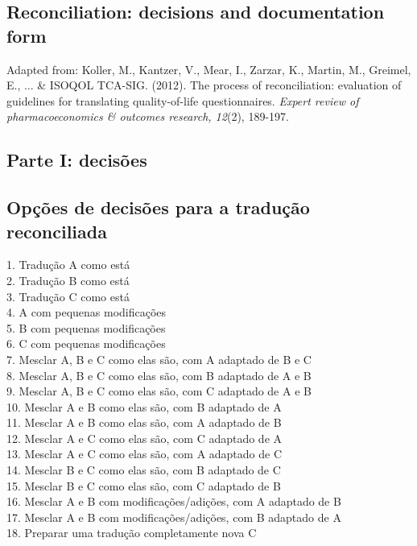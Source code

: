 \begin{appendix}
\section{Reconciliation: decisions and documentation form}
\label{appendix:form}
Adapted from: Koller, M., Kantzer, V., Mear, I., Zarzar, K., Martin, M., Greimel, E., ... \& ISOQOL TCA-SIG. (2012). The process of reconciliation: evaluation of guidelines for translating quality-of-life questionnaires. \textit{Expert review of pharmacoeconomics \& outcomes research, 12}(2), 189-197.
\begin{flushleft}
\subsection{Parte I: decisões}

\subsection{Opções de decisões para a tradução reconciliada}
1.	Tradução A como está\\
2.	Tradução B como está\\
3.	Tradução C como está\\
4.	A com pequenas modificações\\
5.	B com pequenas modificações\\
6.	C com pequenas modificações\\
7.	Mesclar A, B e C como elas são, com A adaptado de B e C\\
8.	Mesclar A, B e C como elas são, com B adaptado de A e B\\
9.	Mesclar A, B e C como elas são, com C adaptado de A e B\\
10.	Mesclar A e B como elas são, com B adaptado de A\\
11.	Mesclar A e B como elas são, com A adaptado de B\\
12.	Mesclar A e C como elas são, com C adaptado de A\\
13.	Mesclar A e C como elas são, com A adaptado de C\\
14.	Mesclar B e C como elas são, com B adaptado de C\\
15.	Mesclar B e C como elas são, com C adaptado de B\\
16.	Mesclar A e B com modificações/adições, com A adaptado de B\\
17.	Mesclar A e B com modificações/adições, com B adaptado de A\\
18.	Preparar uma tradução completamente nova C\\


\end{flushleft}
\end{appendix}
